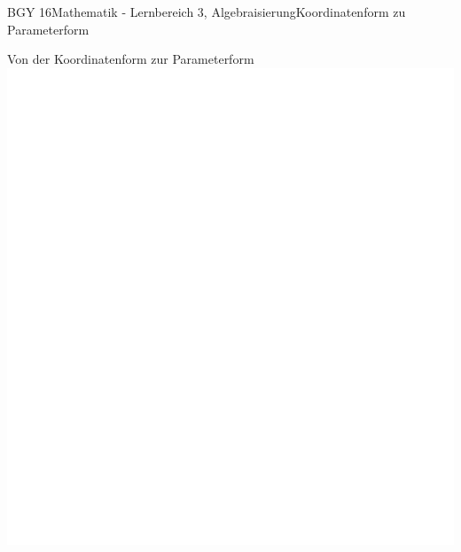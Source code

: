 \documentclass[oneside,openany,headings=optiontotoc,11pt,numbers=noenddot]{scrreprt}
\begin{document}
\begin{worksheet}{BGY 16}{Mathematik - Lernbereich 3, Algebraisierung}{Koordinatenform zu Parameterform}
\begin{framed}
		\end{framed}
		\begin{framed}
			\tiny{\color{codegray}Von der Koordinatenform zur Parameterform}\normalcolor\normalsize\\
			\includegraphics[scale=0.37]{../empty.jpg}
		\end{framed}
	\end{worksheet}
\end{document}
